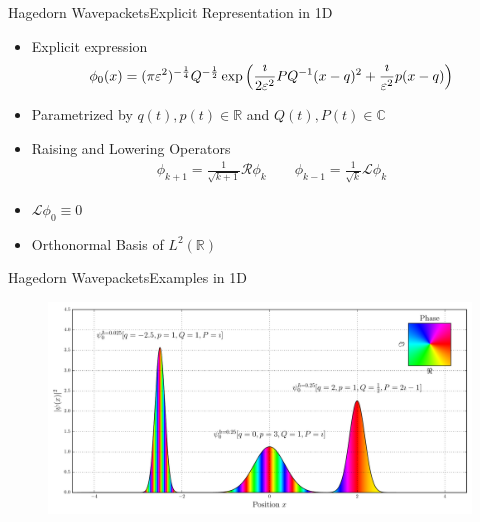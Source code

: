 \documentclass{beamer}
\begin{document}
\begin{frame}{Hagedorn Wavepackets}{Explicit Representation in 1D}
  \begin{itemize}
    \item Explicit expression
    {\scriptsize
    \begin{align*}
      \phi_0(x) = (\pi\varepsilon^2)^{-\frac{1}{4}} Q^{-\frac{1}{2}}
                   \exp \left( \frac{\imath}{2\varepsilon^2} PQ{}^{-1} (x-q)^2 + \frac{\imath}{\varepsilon^2} p (x-q) \right)
    \end{align*}}
    \item Parametrized by $q(t), p(t) \in \mathbb{R}$ and $Q(t), P(t) \in \mathbb{C}$
    \item Raising and Lowering Operators
    \begin{align*}
      \phi_{k+1} = \frac{1}{\sqrt{k+1}} \mathcal{R} \phi_k
      \qquad
      \phi_{k-1} = \frac{1}{\sqrt{k}} \mathcal{L} \phi_k
    \end{align*}
    \item $\mathcal{L} \phi_0 \equiv 0$
    \item Orthonormal Basis of $L^2(\mathbb{R})$
  \end{itemize}
\end{frame}


\begin{frame}{Hagedorn Wavepackets}{Examples in 1D}
  \begin{figure}
    \centering
    \includegraphics[width=\linewidth]{./fig/wavepackets.pdf}
  \end{figure}
\end{frame}
\end{document}
